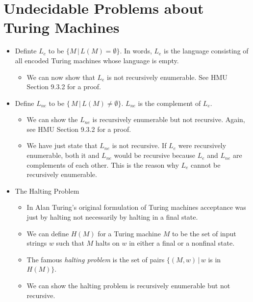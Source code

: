 \documentclass[]{article}
\begin{document}
\section{Undecidable Problems about Turing Machines}
\begin{itemize}
\item Definte $L_e$ to be $\{ M\,|\,L(M) = \emptyset \}$. In words, $L_e$ is the
language consisting of all encoded Turing machines whose language is empty.
\begin{itemize}
\item We can now show that $L_e$ is not recursively enumerable. See HMU Section
9.3.2 for a proof.
\end{itemize}
\item Define $L_{ne}$ to be $\{\,M\,|\,L(M) \neq \emptyset \}$. $L_{ne}$ is the
complement of $L_e$.
\begin{itemize}
\item We can show the $L_{ne}$ is recursively enumerable but not recursive.
Again, see HMU Section 9.3.2 for a proof.
\item We have just state that $L_{ne}$ is not recursive. If $L_e$ were
recursively enumerable, both it and $L_{ne}$ would be recursive because $L_{e}$
and $L_{ne}$ are complements of each other. This is the reason why $L_e$ cannot
be recursively enumerable.
\end{itemize}
\item The Halting Problem
\begin{itemize}
\item In Alan Turing's original formulation of Turing machines acceptance was
just by halting not necessarily by halting in a final state.
\item We can define $H(M)$ for a Turing machine $M$ to be the set of input
strings $w$ such that $M$ halts on $w$ in either a final or a nonfinal state.
\item The famous \emph{halting problem} is the set of pairs $\{(M,w)\,|\,w$ is
in $H(M)\}$.
\item We can show the halting problem is recursively enumerable but not
recursive.
\end{itemize}
\end{itemize}
\end{document}
